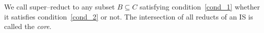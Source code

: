 \documentclass[authoryear,preprint,review,12pt]{elsarticle}
\begin{document}
  We call super--reduct to any subset $B \subseteq C$ satisfying condition~\ref{cond_1} whether it satisfies
  condition~\ref{cond_2} or not. The intersection of all reducts of an IS is called the \textit{core}.
  
%  
%  
  
\end{document}
